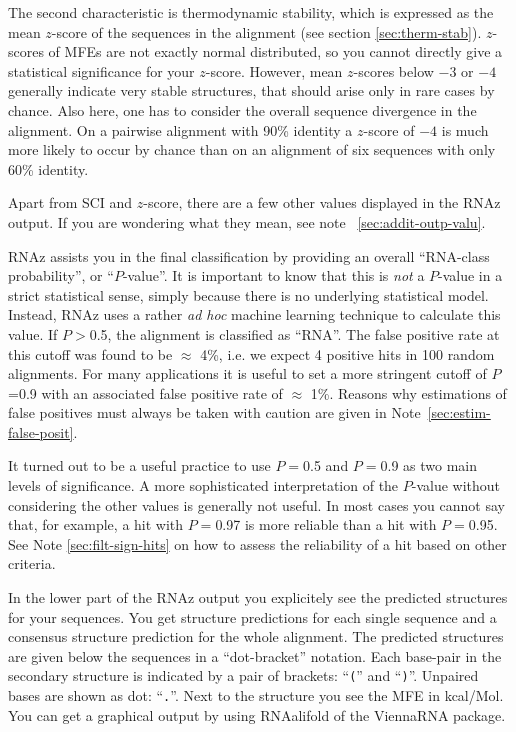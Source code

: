 \documentclass[11pt]{article}
\begin{document}
The second characteristic is thermodynamic stability, which is expressed as
the mean $z$-score of the sequences in the alignment (see section
\ref{sec:therm-stab}). $z$-scores of MFEs are not exactly normal
distributed, so you cannot directly give a statistical significance for
your $z$-score. However, mean $z$-scores below $-3$ or $-4$ generally
indicate very stable structures, that should arise only in rare cases by
chance. Also here, one has to consider the overall sequence divergence in
the alignment. On a pairwise alignment with 90\% identity a $z$-score of
$-4$ is much more likely to occur by chance than on an alignment of six
sequences with only 60\% identity.

Apart from SCI and $z$-score, there are a few other values displayed in the
RNAz output. If you are wondering what they mean, see note
~\ref{sec:addit-outp-valu}.

RNAz assists you in the final classification by providing an overall
``RNA-class probability'', or ``$P$-value''. It is important to know that
this is \emph{not} a $P$-value in a strict statistical sense, simply
because there is no underlying statistical model. Instead, RNAz uses a
rather \emph{ad hoc} machine learning technique to calculate this value.
If $P>$0.5, the alignment is classified as ``RNA''.  The false positive
rate at this cutoff was found to be $\approx$ 4\%, i.e. we expect 4
positive hits in 100 random alignments. For many applications it is useful
to set a more stringent cutoff of $P$=0.9 with an associated false positive
rate of $\approx$ 1\%. Reasons why estimations of false positives must
always be taken with caution are given in Note~\ref{sec:estim-false-posit}.

It turned out to be a useful practice to use $P=$0.5 and $P=$0.9 as two
main levels of significance. A more sophisticated interpretation of the
$P$-value without considering the other values is generally not useful. In
most cases you cannot say that, for example, a hit with $P=$0.97 is more
reliable than a hit with $P=$0.95. See Note \ref{sec:filt-sign-hits} on how
to assess the reliability of a hit based on other criteria.

In the lower part of the RNAz output you explicitely see the predicted
structures for your sequences. You get structure predictions for each
single sequence and a consensus structure prediction for the whole
alignment. The predicted structures are given below the sequences in a
``dot-bracket'' notation. Each base-pair in the secondary structure is
indicated by a pair of brackets: ``\texttt{(}'' and ``\texttt{)}''.
Unpaired bases are shown as dot: ``\texttt{.}''. Next to the structure
you see the MFE in kcal/Mol. You can get a graphical output by using
RNAalifold of the ViennaRNA package.
\end{document}
